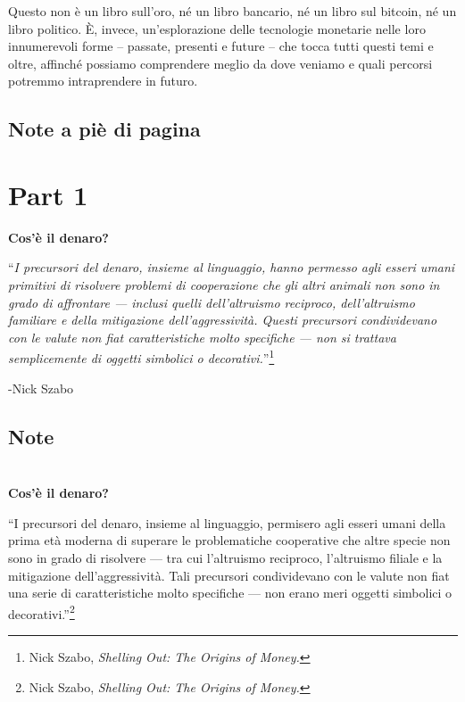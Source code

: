 \documentclass[
  a5paper,
  smalldemyvopaper,10pt,twoside,onecolumn,openright,extrafontsizes,hidelinks]{memoir}
\begin{document}
Questo non è un libro sull'oro, né un libro bancario, né un libro sul
bitcoin, né un libro politico. È, invece, un'esplorazione delle
tecnologie monetarie nelle loro innumerevoli forme -- passate, presenti
e future -- che tocca tutti questi temi e oltre, affinché possiamo
comprendere meglio da dove veniamo e quali percorsi potremmo
intraprendere in futuro.

\section{Note a piè di pagina}\label{note-a-piuxe8-di-pagina-1}


\chapter{Part 1}\label{part-1}

\textbf{Cos'è il denaro?}

``\emph{I precursori del denaro, insieme al linguaggio, hanno permesso
agli esseri umani primitivi di risolvere problemi di cooperazione che
gli altri animali non sono in grado di affrontare --- inclusi quelli
dell'altruismo reciproco, dell'altruismo familiare e della mitigazione
dell'aggressività. Questi precursori condividevano con le valute non
fiat caratteristiche molto specifiche --- non si trattava semplicemente
di oggetti simbolici o decorativi.}''\footnote{Nick Szabo,
  \emph{Shelling Out: The Origins of Money.}}

-Nick Szabo

\section{Note}\label{note}


\chapter{}\label{section}

\textbf{Cos'è il denaro?}

``I precursori del denaro, insieme al linguaggio, permisero agli esseri
umani della prima età moderna di superare le problematiche cooperative
che altre specie non sono in grado di risolvere --- tra cui l'altruismo
reciproco, l'altruismo filiale e la mitigazione dell'aggressività. Tali
precursori condividevano con le valute non fiat una serie di
caratteristiche molto specifiche --- non erano meri oggetti simbolici o
decorativi.''\footnote{Nick Szabo, \emph{Shelling Out: The Origins of
  Money.}}
\end{document}
